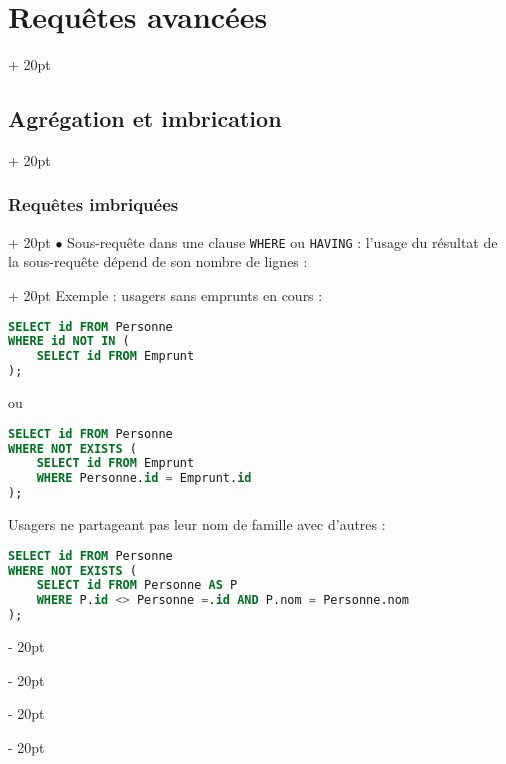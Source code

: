 \documentclass[a4paper, 12pt, twoside]{article}
\newcommand{\ind}[1][20pt]{\advance\leftskip + #1}
\newcommand{\deind}[1][20pt]{\advance\leftskip - #1}
\newenvironment{indt}[2][20pt]{#2 \par \ind[#1]}{\par \deind} %
\begin{document}
\begin{indt}{\section{Requêtes avancées}}
\begin{indt}{\subsection{Agrégation et imbrication}}
\begin{indt}{\subsubsection{Requêtes imbriquées}}
\begin{indt}{$\bullet$ Sous-requête dans une clause \texttt{WHERE} ou \texttt{HAVING} : l'usage du résultat de la sous-requête dépend de son nombre de lignes :}
                    Exemple : usagers sans emprunts en cours :

                    \begin{lstlisting}[language=SQL, xleftmargin=100pt]
SELECT id FROM Personne
WHERE id NOT IN (
    SELECT id FROM Emprunt
);\end{lstlisting}

                    ou

                    \begin{lstlisting}[language=SQL, xleftmargin=100pt]
SELECT id FROM Personne
WHERE NOT EXISTS (
    SELECT id FROM Emprunt
    WHERE Personne.id = Emprunt.id
);\end{lstlisting}

                    \vspace{12pt}
                    
                    Usagers ne partageant pas leur nom de famille avec d'autres :

                    \begin{lstlisting}[language=SQL, xleftmargin=100pt]
SELECT id FROM Personne
WHERE NOT EXISTS (
    SELECT id FROM Personne AS P
    WHERE P.id <> Personne =.id AND P.nom = Personne.nom
);\end{lstlisting}
                \end{indt}
            \end{indt}
        \end{indt}
    \end{indt}
    
    
    
\end{document}
